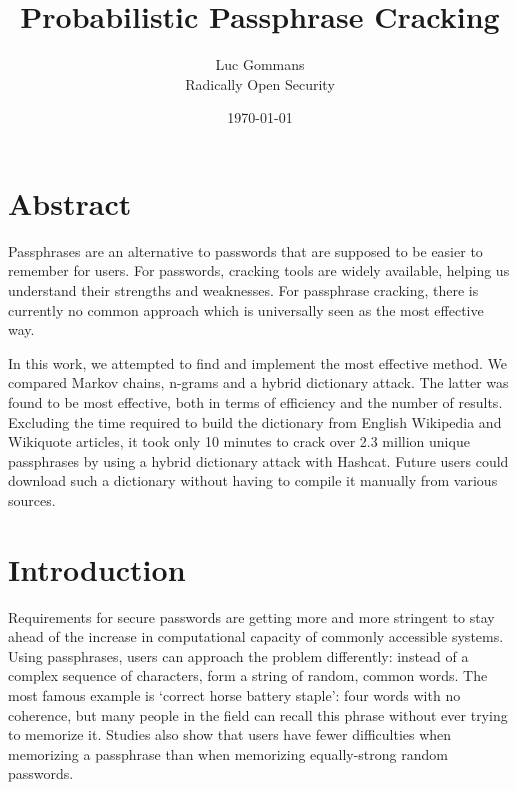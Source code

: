\documentclass{article}
\begin{document}
\title{Probabilistic Passphrase Cracking}
\date{\today{}}
\author{Luc Gommans \\
	Radically Open Security
}

\maketitle

\section*{Abstract}

Passphrases are an alternative to passwords that are supposed to be easier to
remember for users. For passwords, cracking tools are widely available, helping
us understand their strengths and weaknesses. For passphrase cracking, there is
currently no common approach which is universally seen as the most effective
way.

In this work, we attempted to find and implement the most effective method. We
compared Markov chains, n-grams and a hybrid dictionary attack. The latter was
found to be most effective, both in terms of efficiency and the number of
results. Excluding the time required to build the dictionary from English
Wikipedia and Wikiquote articles, it took only 10 minutes to crack over 2.3
million unique passphrases by using a hybrid dictionary attack with Hashcat.
Future users could download such a dictionary without having to compile it
manually from various sources.

\setlength{\parindent}{0pt}
\setlength{\parskip}{\baselineskip}

\newpage

\section{Introduction}

Requirements for secure passwords are getting more and more stringent to stay
ahead of the increase in computational capacity of commonly accessible systems.
Using passphrases, users can approach the problem differently: instead of a
complex sequence of characters, form a string of random, common words. The most
famous example is `correct horse battery staple': four words with no coherence,
but many people in the field can recall this phrase without ever trying to
memorize it\cite{own}. Studies also show that users have fewer difficulties
when memorizing a passphrase than when memorizing equally-strong random
passwords\cite{behavioral-analysis}\cite{pwd-memorability}.
\end{document}
